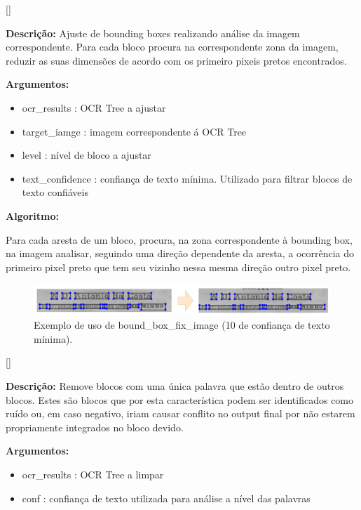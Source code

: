 [\normalsize]

\textbf{Descrição:} Ajuste de bounding boxes realizando análise da imagem correspondente. Para cada bloco procura na correspondente zona da imagem, reduzir as suas dimensões de acordo com os primeiro pixeis pretos encontrados.

\textbf{Argumentos:}
\begin{itemize}\setlength\itemsep{-0.3em}
	\item ocr\_results : OCR Tree a ajustar
	\item target\_iamge : imagem correspondente á OCR Tree
	\item level : nível de bloco a ajustar
	\item text\_confidence : confiança de texto mínima. Utilizado para filtrar blocos de texto confiáveis
\end{itemize}

\textbf{Algoritmo:}

Para cada aresta de um bloco, procura, na zona correspondente à bounding box, na imagem analisar, seguindo uma direção dependente da aresta, a ocorrência do primeiro pixel preto que tem seu vizinho nessa mesma direção outro pixel preto.


\begin{figure}[H]
	\centering
	\includegraphics[width=1\textwidth]{images/ilustracoes/bound_box_fix_image.png}
	\caption{Exemplo de uso de bound\_box\_fix\_image (10 de confiança de texto mínima).}
	\label{fig:bound_box_fix_image}
\end{figure}


[\normalsize]

\textbf{Descrição:} Remove blocos com uma única palavra que estão dentro de outros blocos. Estes são blocos que por esta característica podem ser identificados como ruído ou, em caso negativo, iriam causar conflito no output final por não estarem propriamente integrados no bloco devido.

\textbf{Argumentos:}
\begin{itemize}\setlength\itemsep{-0.3em}
	\item ocr\_results : OCR Tree a limpar
	\item conf : confiança de texto utilizada para análise a nível das palavras
\end{itemize}


